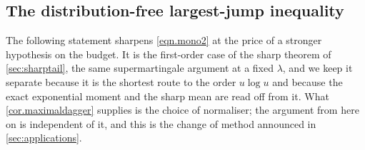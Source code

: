 \documentclass[12pt,oneside,reqno,fleqn]{amsart}
\numberwithin{equation}{section}
\theoremstyle{remark}
\newcommand{\1}{{\mathbf 1}}
\begin{document}
\subsection{The distribution-free largest-jump inequality} %
\label{sec:largestjump}

	The following statement sharpens \eqref{eqn.mono2} at the price of a stronger hypothesis on the budget. It is the first-order case of the sharp theorem of \cref{sec:sharptail}, the same supermartingale argument at a fixed $\lambda$, and we keep it separate because it is the shortest route to the order $u\log u$ and because the exact exponential moment and the sharp mean are read off from it. What \cref{cor.maximaldagger} supplies is the choice of normaliser; the argument from here on is independent of it, and this is the change of method announced in \cref{sec:applications}.
\end{document}
